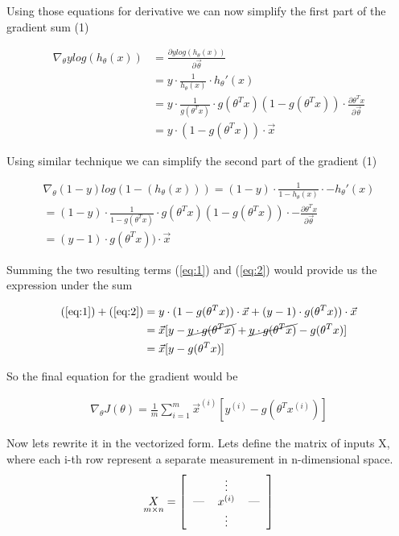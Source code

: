\documentclass{article}
\begin{document}
Using those equations for derivative we can now simplify the first part of the gradient sum (1)

\begin{align}
\nabla_{\theta} y log (h_{\theta}(x)) &= \frac {\partial y log (h_{\theta}(x))}{\partial \vec \theta} \\
&= y \cdot \frac{1}{h_{\theta}(x)} \cdot h_{\theta}'(x) \\
&= y \cdot \frac{1}{g({\theta^T}x)} \cdot g({\theta^T}x)(1 - g({\theta^T}x)) \cdot \frac{\partial\theta^Tx}{\partial\vec{\theta}} \\
&= y \cdot (1 - g({\theta^T}x)) \cdot \vec{x} 
\end{align}

Using similar technique we can simplify the second part of the gradient (1)

\begin{align}
\nabla_{\theta} (1 - y) log (1 - (h_{\theta}(x))) = (1 - y) \cdot \frac{1}{1 - h_{\theta}(x)} \cdot -h_{\theta}'(x) \\
= (1 - y) \cdot \frac{1}{1 - g({\theta^T}x)} \cdot g({\theta^T}x)(1 - g({\theta^T}x)) \cdot -\frac{\partial\theta^Tx}{\partial\vec{\theta}} \\
= (y - 1) \cdot  g({\theta^T}x)) \cdot \vec{x}
\end{align}

Summing the two resulting terms (\ref{eq:1}) and  (\ref{eq:2})  would provide us the expression under the sum

\begin{align}
(\ref{eq:1}) + (\ref{eq:2}) &= y \cdot (1 - g({\theta^T}x)) \cdot \vec{x}  + (y - 1) \cdot  g({\theta^T}x)) \cdot \vec{x} \\
&= \vec{x}[y - \cancel{y \cdot g({\theta^T}x)} + \cancel{y \cdot g({\theta^T}x)} -  g({\theta^T}x)] \\
&= \vec{x}[y -  g({\theta^T}x)]
\end{align}

So the final equation for the gradient would be

\begin{align}
\nabla_{\theta} J(\theta) = \frac1m \sum_{i=1}^m   \vec{x}^{(i)}[y^{(i)} -  g({\theta^T}x^{(i)})]
\end{align}


Now lets rewrite it in the vectorized form. Lets define the matrix of inputs X, where each i-th row represent a separate measurement in n-dimensional space.
\[
\underset{m \times n}{X} = 
\left[
  \begin{tabular}{c>{$}c<{$}c}
    & \vdots & \\
    --- & x^{(i)} & ---\\
    & \vdots & \\
  \end{tabular}
\right]
\]
\end{document}
